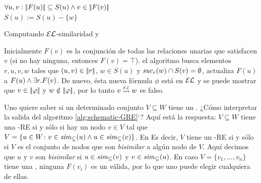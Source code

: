\begin{algorithm}\small
{}
\io


\While{\guard}
{
  $\forall u,v: |\!|F(u)|\!| \subseteq S(u)\wedge v \in |\!|F(v)|\!|$\\
$S(u):=S(u)-\{w\}$ \label{alg:line:loop-body-begin}

} \caption{\small
Computando $\mathcal{EL}$-similaridad y \posre}\label{alg:schematic-GRE}
\end{algorithm}

Inicialmente $F(v)$ es la conjunci\'on de todas las relaciones unarias que
satisfacen $v$ (si no hay ninguna, entonces $F(v)=\top$).
el algoritmo busca elementos $r,u,v,w$ tales que
$(u,v)\in|\!|r|\!|$, $w\in S(u)$ y ${\it suc}_{r}(w)\cap
S(v)=\emptyset$, actualiza $F(u)$ a $F(u)\wedge\exists r. F(v)$.
De nuevo, \'esta nueva f\'ormula $\phi$ est\'a en $\mathcal{EL}$ y se puede mostrar que
$v\in|\!|\varphi|\!|$ y $w\notin|\!|\varphi|\!|$, por lo tanto $v\simil{\EL} w$ es falso.



%

\iffullversion Uno quiere saber si un determinado conjunto  $V\subseteq W$
tiene un \posre. ¿C\'omo interpretar la salida del algoritmo
\ref{alg:schematic-GRE}`? Aqu\'i est\'a la respuesta: $V\subseteq W$ tiene una
\EL-RE si y s\'olo si hay un nodo $v\in V$ tal que  $V=\{u\in W\colon
v\in{\it sim}_\subseteq(u) \wedge u\in{\it sim}_\subseteq(v)\}$. En
Es decir, $V$ tiene un \EL-RE si y s\'olo si $V$ es el conjunto de nodos que son
\emph{bisimilar} a alg\'un nodo de $V$. Aqu\'i decimos que $u$ y $v$
son \emph{bisimilar} si $u\in{\it sim}_\subseteq(v)$ y
$v\in{\it sim}_\subseteq(u)$. En caso  $V=\{v_1,\dots,v_n\}$ tiene una
\posre, ninguna $F(v_i)$ es un \posre v\'alida, por lo que uno puede elegir cualquiera de ellas.

